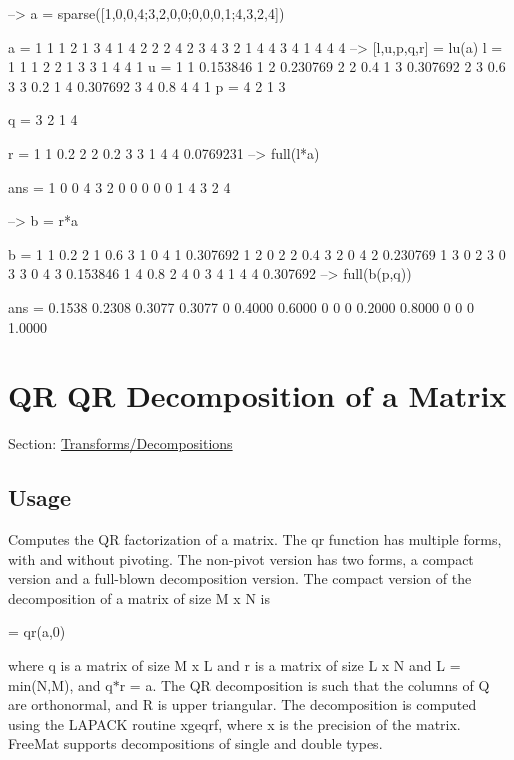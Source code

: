 \begin{DoxyVerbInclude}
--> a = sparse([1,0,0,4;3,2,0,0;0,0,0,1;4,3,2,4])

a = 
 1 1 1
 2 1 3
 4 1 4
 2 2 2
 4 2 3
 4 3 2
 1 4 4
 3 4 1
 4 4 4
--> [l,u,p,q,r] = lu(a)
l = 
 1 1 1
 2 2 1
 3 3 1
 4 4 1
u = 
 1 1 0.153846
 1 2 0.230769
 2 2 0.4
 1 3 0.307692
 2 3 0.6
 3 3 0.2
 1 4 0.307692
 3 4 0.8
 4 4 1
p = 
 4 
 2 
 1 
 3 

q = 
 3 
 2 
 1 
 4 

r = 
 1 1 0.2
 2 2 0.2
 3 3 1
 4 4 0.0769231
--> full(l*a)

ans = 
 1 0 0 4 
 3 2 0 0 
 0 0 0 1 
 4 3 2 4 

--> b = r*a

b = 
 1 1 0.2
 2 1 0.6
 3 1 0
 4 1 0.307692
 1 2 0
 2 2 0.4
 3 2 0
 4 2 0.230769
 1 3 0
 2 3 0
 3 3 0
 4 3 0.153846
 1 4 0.8
 2 4 0
 3 4 1
 4 4 0.307692
--> full(b(p,q))

ans = 
    0.1538    0.2308    0.3077    0.3077 
         0    0.4000    0.6000         0 
         0         0    0.2000    0.8000 
         0         0         0    1.0000 
\end{DoxyVerbInclude}
 \hypertarget{transforms_qr}{}\section{Q\-R Q\-R Decomposition of a Matrix}\label{transforms_qr}
Section\-: \hyperlink{sec_transforms}{Transforms/\-Decompositions} \hypertarget{vtkwidgets_vtkxyplotwidget_Usage}{}\subsection{Usage}\label{vtkwidgets_vtkxyplotwidget_Usage}
Computes the Q\-R factorization of a matrix. The {\ttfamily qr} function has multiple forms, with and without pivoting. The non-\/pivot version has two forms, a compact version and a full-\/blown decomposition version. The compact version of the decomposition of a matrix of size {\ttfamily M x N} is \begin{DoxyVerb}  [q,r] = qr(a,0)
\end{DoxyVerb}
 where {\ttfamily q} is a matrix of size {\ttfamily M x L} and {\ttfamily r} is a matrix of size {\ttfamily L x N} and {\ttfamily L = min(\-N,\-M)}, and {\ttfamily q$\ast$r = a}. The Q\-R decomposition is such that the columns of {\ttfamily Q} are orthonormal, and {\ttfamily R} is upper triangular. The decomposition is computed using the L\-A\-P\-A\-C\-K routine {\ttfamily xgeqrf}, where {\ttfamily x} is the precision of the matrix. Free\-Mat supports decompositions of {\ttfamily single} and {\ttfamily double} types.

